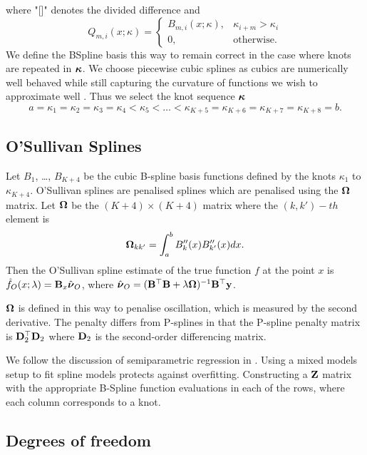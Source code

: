 \noindent where "[]" denotes the divided difference and
$$
Q_{m, i}(x; \kappa) =
\begin{cases}
B_{m, i}(x; \kappa),& \kappa_{i + m} > \kappa_i \\
0, & \text{otherwise}.
\end{cases}
$$
We define the BSpline basis this way to remain correct in the case where knots are repeated in ${\boldsymbol \kappa}$. We
choose piecewise cubic splines as cubics are numerically well behaved while still capturing the curvature of
functions we wish to approximate well \citep{Press:2007:NRE:1403886}. Thus we select the knot sequence
${\boldsymbol \kappa}$
$$
a = \kappa_1 = \kappa_2 = \kappa_3 = \kappa_4 < \kappa_5 < \ldots < \kappa_{K+5} = \kappa_{K+6} = \kappa_{K+7} = \kappa_{K+8} = b.
$$

\subsection{O'Sullivan Splines}

Let $B_1$, \ldots, $B_{K+4}$ be the cubic B-spline basis functions defined by the knots $\kappa_1$ to
$\kappa_{K+4}$. O'Sullivan splines are penalised splines which are penalised using the ${\boldsymbol \Omega}$ matrix.
Let ${\boldsymbol \Omega}$ be the $(K+4) \times (K+4)$ matrix where the $(k, k')-th$ element is
\[
	{\boldsymbol \Omega}_{k k'} = \int_a^b B''_k(x) B''_{k'}(x) dx.
\]
Then the O'Sullivan spline estimate of the true function $f$ at the point $x$ is
$\hat{f}_O(x; \lambda) = {\bf B}_x \hat{{\boldsymbol \nu}}_O$, where
$\hat{{\boldsymbol \nu}}_O = ({\bf B}^\top {\bf B} + \lambda {\boldsymbol\Omega})^{-1} {\bf B}^\top {\bf y}$.

${\boldsymbol \Omega}$ is defined in this way to penalise oscillation, which is measured by the second derivative.
The penalty differs from P-splines in that the P-spline penalty matrix is ${\bf D}_2^\top {\bf D}_2$ where ${\bf D}_2$ is
the second-order differencing matrix.

We follow the discussion of semiparametric regression in \cite{ruppert_wand_carroll_2003}.
Using a mixed models setup to fit spline models protects against overfitting.
Constructing a ${\bf Z}$ matrix with the appropriate B-Spline function evaluations in each of the rows, where
each column corresponds to a knot.

  
\subsection{Degrees of freedom}

